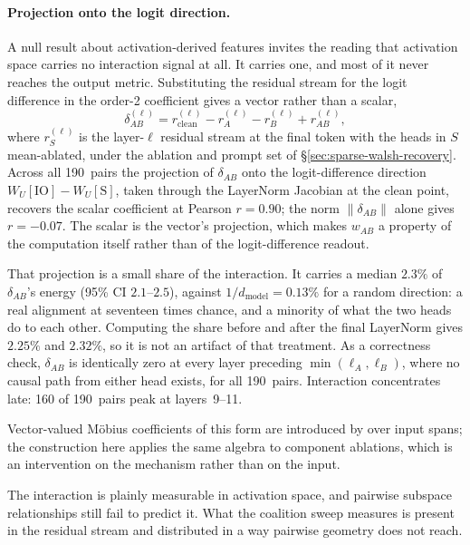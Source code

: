 \documentclass{article}
\begin{document}
\paragraph{Projection onto the logit direction.}
A null result about activation-derived features invites the reading that activation
space carries no interaction signal at all. It carries one, and most of it never
reaches the output metric. Substituting the residual stream
for the logit difference in the order-2 coefficient gives a vector rather than a
scalar,
\begin{equation}
\delta_{AB}^{(\ell)}
  = r^{(\ell)}_{\text{clean}} - r^{(\ell)}_{A} - r^{(\ell)}_{B}
    + r^{(\ell)}_{AB},
\label{eq:delta-vector}
\end{equation}
where $r^{(\ell)}_{S}$ is the layer-$\ell$ residual stream at the final token with the
heads in $S$ mean-ablated, under the ablation and prompt set of
\S\ref{sec:sparse-walsh-recovery}. Across all 190~pairs the projection of $\delta_{AB}$ onto the logit-difference
direction $W_U[\text{IO}] - W_U[\text{S}]$, taken through the LayerNorm Jacobian at
the clean point, recovers the scalar coefficient at Pearson $r = 0.90$; the norm
$\lVert \delta_{AB} \rVert$ alone gives $r = {-}0.07$. The scalar is the vector's
projection, which makes $w_{AB}$ a property of the computation itself rather than of
the logit-difference readout.

That projection is a small share of the interaction. It carries a median $2.3\%$ of
$\delta_{AB}$'s energy (95\% CI $2.1$--$2.5$), against $1/d_{\text{model}} = 0.13\%$
for a random direction: a real alignment at seventeen times chance, and a minority of
what the two heads do to each other. Computing the share before and after the final
LayerNorm gives $2.25\%$ and $2.32\%$, so it is not an artifact of that treatment. As a correctness check, $\delta_{AB}$
is identically zero at every layer preceding $\min(\ell_A, \ell_B)$, where no causal
path from either head exists, for all 190~pairs. Interaction concentrates late: 160 of 190~pairs peak at layers~9--11.

Vector-valued M\"obius coefficients of this form are introduced by
\citet{jansma2026compositional} over input spans; the construction
here applies the same algebra to component ablations, which is an intervention on the
mechanism rather than on the input.

The interaction is plainly measurable in activation space, and pairwise subspace relationships still fail to predict it. What the coalition
sweep measures is present in the residual stream and distributed in a way pairwise
geometry does not reach.
\end{document}
